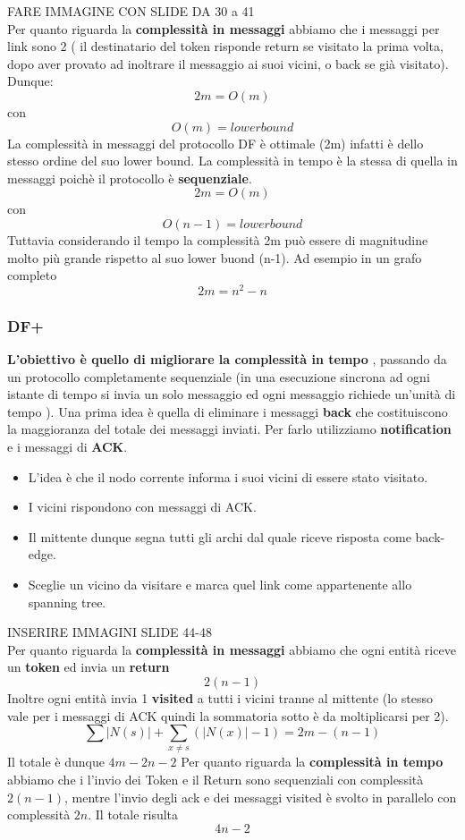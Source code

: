 \documentclass[12pt]{article}
\begin{document}
			FARE IMMAGINE CON SLIDE DA 30 a 41\\
			
			Per quanto riguarda la \textbf{complessità in messaggi} abbiamo che i messaggi per link sono 2 ( il destinatario del token risponde return se visitato la prima volta, dopo aver provato ad inoltrare il messaggio ai suoi vicini, o back se già visitato).  Dunque:
			$$2m = O(m) $$ con $$O(m) = lower bound $$
			La complessità in messaggi del protocollo DF è ottimale (2m) infatti è dello stesso ordine del suo lower bound.
			La complessità in tempo è la stessa di quella in messaggi poichè il protocollo è \textbf{sequenziale}.
			$$2m = O(m) $$ 	con $$O(n-1) = lower bound $$
			Tuttavia considerando il tempo la complessità 2m può essere di magnitudine molto più grande rispetto al suo lower buond (n-1). Ad esempio in un grafo completo 
			$$2m = n^2 - n $$
			
			
		\subsubsection{DF+}
			\textbf{L'obiettivo è quello di migliorare la complessità in tempo }, passando da un protocollo completamente sequenziale (in una esecuzione sincrona ad ogni istante di tempo si invia un solo messaggio ed ogni messaggio richiede un'unità di tempo ).
			Una prima idea è quella di eliminare i messaggi \textbf{back} che costituiscono la maggioranza del totale dei messaggi inviati. Per farlo utilizziamo \textbf{notification} e i messaggi di \textbf{ACK}. 
			\begin{itemize}
				\item L'idea è che il nodo corrente informa i suoi vicini di essere stato visitato.
				\item I vicini rispondono con messaggi di ACK. 
				\item Il mittente dunque segna tutti gli archi dal quale riceve risposta come back-edge.
				\item Sceglie un vicino da visitare e marca quel link come appartenente allo spanning tree. 
			\end{itemize}
			
			INSERIRE IMMAGINI SLIDE 44-48\\
			
			Per quanto riguarda la \textbf{complessità in messaggi} abbiamo che ogni entità riceve un \textbf{token} ed invia un \textbf{return} $$2(n-1)$$
			Inoltre ogni entità invia 1 \textbf{visited} a tutti i vicini tranne al mittente (lo stesso vale per i messaggi di ACK quindi la sommatoria sotto è da moltiplicarsi per 2).
			$$\sum|N(s)|+\sum_{x\neq s}(|N(x)|-1) = 2m-(n-1) $$
			Il totale è dunque $4m-2n-2 $
			Per quanto riguarda la \textbf{complessità in tempo} abbiamo che i l'invio dei Token e il Return sono sequenziali con complessità $2(n-1)$, mentre l'invio degli ack e dei messaggi visited è svolto in parallelo con complessità $2n$. Il totale risulta $$4n-2$$
			
\end{document}
